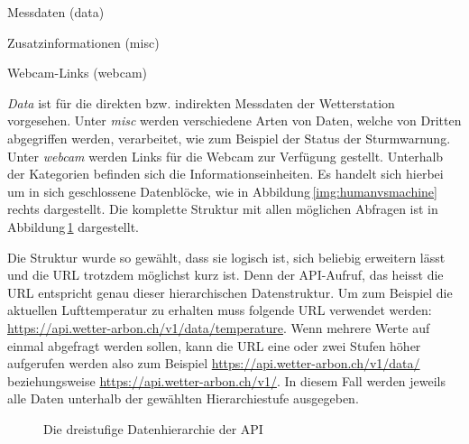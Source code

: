 \begin{itemize*}
\item Messdaten (data)
\item Zusatzinformationen (misc)
\item Webcam-Links (webcam)
\end{itemize*}

\noindent
\emph{Data} ist für die direkten bzw. indirekten Messdaten der Wetterstation vorgesehen. Unter \emph{misc} werden verschiedene Arten von Daten, welche von Dritten abgegriffen werden, verarbeitet, wie zum Beispiel der Status der Sturmwarnung. Unter \emph{webcam} werden Links für die Webcam zur Verfügung gestellt. Unterhalb der Kategorien befinden sich die Informationseinheiten. Es handelt sich hierbei um in sich geschlossene Datenblöcke, wie in Abbildung\,\ref{img:humanvsmachine} rechts dargestellt. Die komplette Struktur mit allen möglichen Abfragen ist in Abbildung\,\ref{img:hierarchie} dargestellt.

Die Struktur wurde so gewählt, dass sie logisch ist, sich beliebig erweitern lässt und die URL trotzdem möglichst kurz ist. Denn der API-Aufruf, das heisst die URL entspricht genau dieser hierarchischen Datenstruktur. Um zum Beispiel die aktuellen Lufttemperatur zu erhalten muss folgende URL verwendet werden: \url{https://api.wetter-arbon.ch/v1/data/temperature}. Wenn mehrere Werte auf einmal abgefragt werden sollen, kann die URL eine oder zwei Stufen höher aufgerufen werden also zum Beispiel \url{https://api.wetter-arbon.ch/v1/data/} beziehungsweise \url{https://api.wetter-arbon.ch/v1/}. In diesem Fall werden jeweils alle Daten unterhalb der gewählten Hierarchiestufe ausgegeben.


\begin{figure}[htbp!]
	\centering
	\caption{Die dreistufige Datenhierarchie der API}
	\label{img:hierarchie}
\end{figure}


